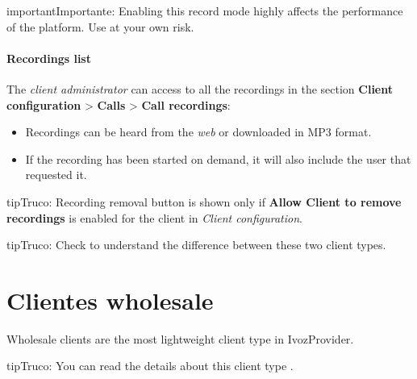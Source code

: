 \documentclass[letterpaper,10pt,spanish]{sphinxmanual}
\begin{document}
\begin{notice}{important}{Importante:}
Enabling this record mode highly affects the performance of the
platform. Use at your own risk.
\end{notice}


\paragraph{Recordings list}
\label{administration_portal/client/retail/calls/call_recordings:recordings-list}
The \emph{client administrator} can access to all the recordings in the section
\textbf{Client configuration} \textgreater{} \textbf{Calls} \textgreater{} \textbf{Call recordings}:
\begin{itemize}
\item {} 
Recordings can be heard from the \emph{web} or downloaded in MP3 format.

\item {} 
If the recording has been started on demand, it will also include the user
that requested it.

\end{itemize}

\begin{notice}{tip}{Truco:}
Recording removal button is shown only if \textbf{Allow Client to remove recordings} is enabled
for the client in \emph{Client configuration}.
\end{notice}

\begin{notice}{tip}{Truco:}
Check {\hyperref[administration_portal/brand/clients/retail:differences\string-between\string-retail\string-and\string-residential\string-clients]{}} to understand the difference between these two
client types.
\end{notice}


\section{Clientes wholesale}
\label{administration_portal/client/wholesale/index:wholesale-clients}\label{administration_portal/client/wholesale/index::doc}
Wholesale clients are the most lightweight client type in IvozProvider.

\begin{notice}{tip}{Truco:}
You can read the details about this client type {\hyperref[administration_portal/brand/clients/wholesale:wholesale\string-clients]{}}.
\end{notice}
\end{document}
